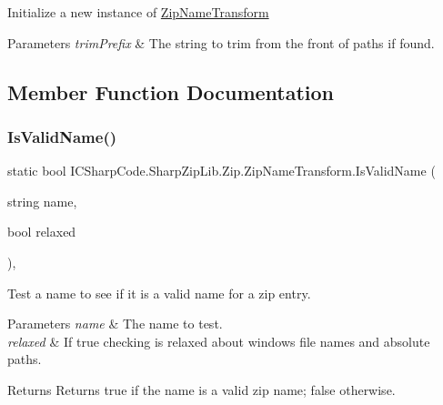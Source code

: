 Initialize a new instance of \hyperlink{class_i_c_sharp_code_1_1_sharp_zip_lib_1_1_zip_1_1_zip_name_transform}{Zip\+Name\+Transform} 


\begin{DoxyParams}{Parameters}
{\em trim\+Prefix} & The string to trim from the front of paths if found.\\
\hline
\end{DoxyParams}


\subsection{Member Function Documentation}
\mbox{\label{class_i_c_sharp_code_1_1_sharp_zip_lib_1_1_zip_1_1_zip_name_transform_af81c92be4ef74892e7098d0645eb28fb}} 
\subsubsection{\texorpdfstring{Is\+Valid\+Name()}{IsValidName()}\hspace{0.1cm}{\footnotesize\ttfamily [1/2]}}
{\footnotesize\ttfamily static bool I\+C\+Sharp\+Code.\+Sharp\+Zip\+Lib.\+Zip.\+Zip\+Name\+Transform.\+Is\+Valid\+Name (\begin{DoxyParamCaption}\item[{string}]{name,  }\item[{bool}]{relaxed }\end{DoxyParamCaption})\hspace{0.3cm}{\ttfamily [inline]}, {\ttfamily [static]}}



Test a name to see if it is a valid name for a zip entry. 


\begin{DoxyParams}{Parameters}
{\em name} & The name to test.\\
\hline
{\em relaxed} & If true checking is relaxed about windows file names and absolute paths.\\
\hline
\end{DoxyParams}
\begin{DoxyReturn}{Returns}
Returns true if the name is a valid zip name; false otherwise.
\end{DoxyReturn}


